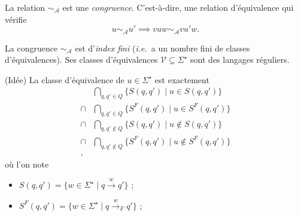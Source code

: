 \documentclass[./main]{subfiles}
\begin{document}
  \begin{lem}
    La relation $\sim_\mathcal{A}$ est une \textit{congruence}.
    C'est-à-dire, une relation d'équivalence qui vérifie 
    \[
    u \sim_\mathcal{A} u' \implies v u w \sim_\mathcal{A} v u' w
    .\] 
  \end{lem}

  \begin{lem}
    La congruence $\sim_\mathcal{A}$ est d'\textit{index fini} (\textit{i.e.}\ a un nombre fini de classes d'équivalences).
    Ses classes d'équivalences $\mathcal{V} \subseteq \Sigma^\star$ sont des langages réguliers.
  \end{lem}
  \begin{prv}
    (Idée)
    La classe d'équivalence de $u \in \Sigma^\star$ est exactement 
    \begin{align*}
      & \bigcap_{q, q' \in Q} \{S(q, q')  \mid u \in S(q, q')\} \\
      \cap & \bigcap_{q, q' \in Q} \{S^F(q, q')  \mid u \in S^F(q, q')\} \\
      \cap & \bigcap_{q, q' \not\in  Q} \{S(q, q')  \mid u \not\in S(q, q')\} \\
      \cap & \bigcap_{q, q' \not\in Q} \{S^F(q, q')  \mid u \not\in S^F(q, q')\} \\
    ,\end{align*}
    où l'on note
    \begin{itemize}
      \item $S(q, q') = \{w \in \Sigma^\star  \mid q \xrightarrow w q'\}$ ;
      \item $S^F(q, q') = \{w \in \Sigma^\star  \mid q \xrightarrow w_F q'\}$ ;
    \end{itemize}
  \end{prv}
\end{document}
